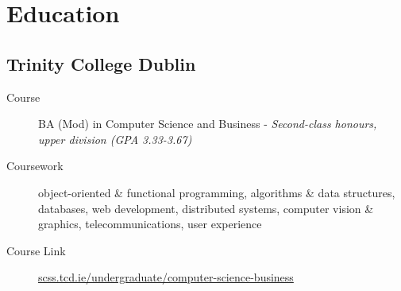 \section*{Education}

\subsection*{Trinity College Dublin}
\begin{description}
  \item[Course] BA (Mod) in Computer Science and Business - \emph{Second-class honours, upper division (GPA 3.33-3.67)}
  \item[Coursework] object-oriented \& functional programming, algorithms \& data structures, databases, web development, distributed systems, computer vision \& graphics, telecommunications, user experience
  \item[Course Link] \href{https://www.scss.tcd.ie/undergraduate/computer-science-business/}{scss.tcd.ie/undergraduate/computer-science-business}
\end{description}
